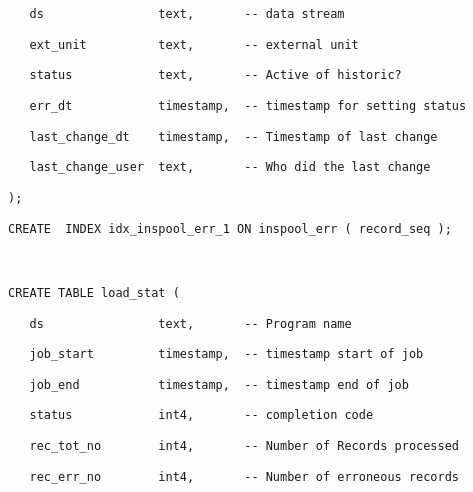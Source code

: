 \begin{table}[htbp]
\texttt{\scriptsize ~~ ds~~~~~~~~~~~~~~~ text,~~~~~~
-{}- data stream}{\scriptsize \par}

\texttt{\scriptsize ~~ ext\_unit~~~~~~~~~ text,~~~~~~
-{}- external unit }{\scriptsize \par}

\texttt{\scriptsize ~~ status~~~~~~~~~~~ text,~~~~~~
-{}- Active of historic?}{\scriptsize \par}

\texttt{\scriptsize ~~ err\_dt~~~~~~~~~~~ timestamp,~
-{}- timestamp for setting status}{\scriptsize \par}

\texttt{\scriptsize ~~ last\_change\_dt~~~ timestamp,~ -{}-
Timestamp of last change}{\scriptsize \par}

\texttt{\scriptsize ~~ last\_change\_user~ text,~~~~~~ -{}-
Who did the last change}{\scriptsize \par}

\texttt{\scriptsize );}{\scriptsize \par}

\texttt{\scriptsize CREATE~ INDEX idx\_inspool\_err\_1 ON inspool\_err
( record\_seq );}{\scriptsize \par}

~

\texttt{\scriptsize CREATE TABLE load\_stat (}{\scriptsize \par}

\texttt{\scriptsize ~~ ds~~~~~~~~~~~~~~~ text,~~~~~~
-{}- Program name}{\scriptsize \par}

\texttt{\scriptsize ~~ job\_start~~~~~~~~ timestamp,~ -{}-
timestamp start of job}{\scriptsize \par}

\texttt{\scriptsize ~~ job\_end~~~~~~~~~~ timestamp,~
-{}- timestamp end of job}{\scriptsize \par}

\texttt{\scriptsize ~~ status~~~~~~~~~~~ int4,~~~~~~
-{}- completion code}{\scriptsize \par}

\texttt{\scriptsize ~~ rec\_tot\_no~~~~~~~ int4,~~~~~~
-{}- Number of Records processed}{\scriptsize \par}

\texttt{\scriptsize ~~ rec\_err\_no~~~~~~~ int4,~~~~~~
-{}- Number of erroneous records}{\scriptsize \par}


\end{table}
